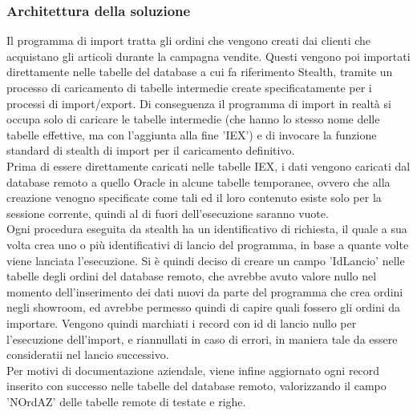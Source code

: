 \subsubsection{Architettura della soluzione}
Il programma di import tratta gli ordini che vengono creati dai clienti che acquistano gli articoli durante la campagna vendite. Questi vengono poi importati direttamente nelle tabelle del database a cui fa riferimento Stealth, tramite un processo di caricamento di tabelle intermedie create specificatamente per i processi di import/export. Di conseguenza il programma di import in realtà si occupa solo di caricare le tabelle intermedie (che hanno lo stesso nome delle tabelle effettive, ma con l'aggiunta alla fine 'IEX') e di invocare la funzione standard di stealth di import per il caricamento definitivo.\\
Prima di essere direttamente caricati nelle tabelle IEX, i dati vengono caricati dal database remoto a quello Oracle in alcune tabelle temporanee, ovvero che alla creazione venogno specificate come tali ed il loro contenuto esiste solo per la sessione corrente, quindi al di fuori dell'esecuzione saranno vuote.\\
Ogni procedura eseguita da stealth ha un identificativo di richiesta, il quale a sua volta crea uno o più identificativi di lancio del programma, in base a quante volte viene lanciata l'esecuzione. Si è quindi deciso di creare un campo 'IdLancio' nelle tabelle degli ordini del database remoto, che avrebbe avuto valore nullo nel momento dell'inserimento dei dati nuovi da parte del programma che crea ordini negli showroom, ed avrebbe permesso quindi di capire quali fossero gli ordini da importare. Vengono quindi marchiati i record con id di lancio nullo per l'esecuzione dell'import, e riannullati in caso di errori, in maniera tale da essere consideratii nel lancio successivo.\\
Per motivi di documentazione aziendale, viene infine aggiornato ogni record inserito con successo nelle tabelle del database remoto, valorizzando il campo 'NOrdAZ' delle tabelle remote di testate e righe.
